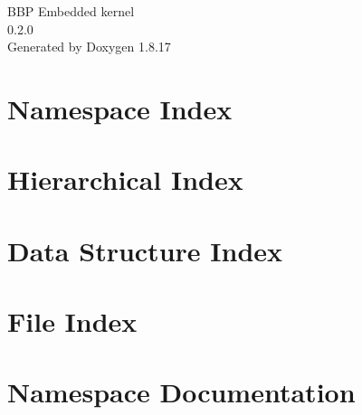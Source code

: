 \let\mypdfximage\pdfximage\def\pdfximage{\immediate\mypdfximage}\documentclass[twoside]{book}
\newcommand{\+}{\discretionary{\mbox{\scriptsize$\hookleftarrow$}}{}{}}
\newcommand{\clearemptydoublepage}{%
  \newpage{\pagestyle{empty}\cleardoublepage}%
}
\begin{document}
\hypersetup{pageanchor=false,
             bookmarksnumbered=true,
             pdfencoding=unicode
            }
\begin{titlepage}
\vspace*{7cm}
\begin{center}%
{\Large B\+BP Embedded kernel \\[1ex]\large 0.\+2.\+0 }\\
\vspace*{1cm}
{\large Generated by Doxygen 1.8.17}\\
\end{center}
\end{titlepage}
\clearemptydoublepage
{}
\tableofcontents
\clearemptydoublepage
{}
\hypersetup{pageanchor=true}

\chapter{Namespace Index}

\chapter{Hierarchical Index}

\chapter{Data Structure Index}

\chapter{File Index}

\chapter{Namespace Documentation}











\end{document}
